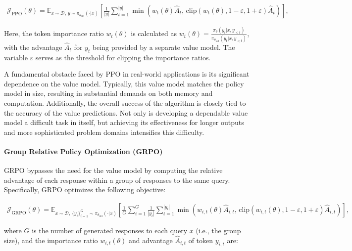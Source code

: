 \begin{align}
\mathcal{J}_\text{PPO}(\theta) = \mathbb{E}_{ x \sim \mathcal{D},\, y \sim \pi_{\theta_\text{old}}( \cdot | x) }
\left[ \frac{1}{|y|} \sum_{t=1}^{|y|} 
\min \left( w_{t}(\theta) \widehat{A}_{t},  \, \mathrm{clip} \left( w_{t}(\theta), 1 - {\varepsilon}, 1 + {\varepsilon}\right) \widehat{A}_{t} \right)
\right],
\end{align}

Here, the token importance ratio $w_{t}(\theta)$ is calculated as $
w_{t}(\theta) = \frac{ \pi_{\theta} (y_{t} | x, y_{<t}) }{ \pi_{\theta_\text{old}} (y_{t} | x,y_{<t})} $, with the advantage $\widehat{A}_{t}$ for $y_t$ being provided by a separate value model. The variable $\varepsilon$ serves as the threshold for clipping the importance ratios.

A fundamental obstacle faced by PPO in real-world applications is its significant dependence on the value model. Typically, this value model matches the policy model in size, resulting in substantial demands on both memory and computation. Additionally, the overall success of the algorithm is closely tied to the accuracy of the value predictions. Not only is developing a dependable value model a difficult task in itself, but achieving its effectiveness for longer outputs and more sophisticated problem domains intensifies this difficulty.

\paragraph{Group Relative Policy Optimization (GRPO)} GRPO \citep{grpo} bypasses the need for the value model by computing the relative advantage of each response within a group of responses to the same query. Specifically, GRPO optimizes the following objective:

\begin{align}
\label{equ:grpo}
\mathcal{J}_\text{GRPO}(\theta) = \mathbb{E}_{ x \sim \mathcal{D},\, \{y_i\}_{i=1}^G \sim \pi_{\theta_\text{old}}( \cdot | x) }
\left[ \frac{1}{G} \sum_{i=1}^{G} \frac{1}{|y_i|} \sum_{t=1}^{|y_i|} 
\min \left( w_{i,t}(\theta) \widehat{A}_{i,t},  \, \mathrm{clip} \left( w_{i,t}(\theta), 1 - {\varepsilon}, 1 + {\varepsilon}\right) \widehat{A}_{i,t} \right)
\right],
\end{align}

where $G$ is the number of generated responses to each query $x$ (i.e., the group size), and the importance ratio $w_{i,t}(\theta)$ and advantage $\widehat{A}_{i,t}$ of token $y_{i,t}$ are:

